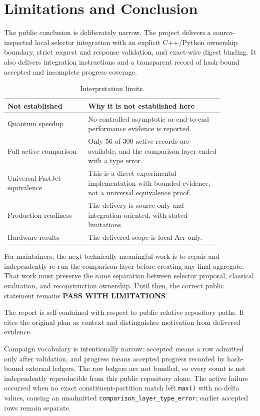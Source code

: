 \section{Limitations and Conclusion}
The public conclusion is deliberately narrow. The project delivers a source-inspected local selector integration with an explicit C++/Python ownership boundary, strict request and response validation, and exact-wire digest binding. It also delivers integration instructions and a transparent record of hash-bound accepted and incomplete progress coverage.

\begin{table}[htbp]\centering\small
\caption{Interpretation limits.}\begin{tabular}{L{0.32\linewidth}L{0.54\linewidth}}\toprule
Not established & Why it is not established here\\\midrule
Quantum speedup & No controlled asymptotic or end-to-end performance evidence is reported.\\
Full active comparison & Only 56 of 300 active records are available, and the comparison layer ended with a type error.\\
Universal FastJet equivalence & This is a direct experimental implementation with bounded evidence, not a universal equivalence proof.\\
Production readiness & The delivery is source-only and integration-oriented, with stated limitations.\\
Hardware results & The delivered scope is local Aer only.\\\bottomrule
\end{tabular}\end{table}

For maintainers, the next technically meaningful work is to repair and independently re-run the comparison layer before creating any final aggregate. That work must preserve the same separation between selector proposal, classical evaluation, and reconstruction ownership. Until then, the correct public statement remains \textbf{PASS WITH LIMITATIONS}.

\measured The report is self-contained with respect to public relative repository paths. It cites the original plan as context \cite{MitacsPlan2026} and distinguishes motivation from delivered evidence.

Campaign vocabulary is intentionally narrow: accepted means a row admitted only after validation, and progress means accepted progress recorded by hash-bound external ledgers. The raw ledgers are not bundled, so every count is not independently reproducible from this public repository alone. The active failure occurred when no exact constituent-partition match left \texttt{max()} with no delta values, causing an unadmitted \texttt{comparison\_layer\_type\_error}; earlier accepted rows remain separate.
